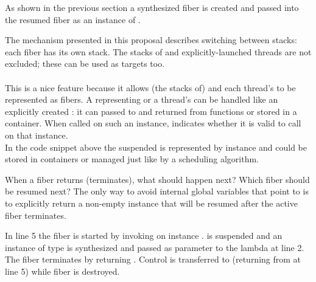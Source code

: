 
\label{representation}
As shown in the previous section a synthesized fiber is created and passed
into the resumed fiber as an instance of \fiber.\\

The mechanism presented in this proposal describes switching between stacks: each
fiber has its own stack. The stacks of \main and explicitly-launched threads
are not excluded; these can be used as targets too.\\
\\
This is a nice feature because it allows (the stacks of) \main and each
thread's \entryfn to be represented as fibers. A \fiber
representing \main or a thread's \entryfn can be handled like an
explicitly created \fiber: it can passed to and returned from functions or
stored in a container. When called on such an instance, \canxtresume indicates
whether it is valid to call \xtresumesome on that instance.\\

In the code snippet above the suspended \main is represented by instance
 and could be stored in containers or managed just like 
by a scheduling algorithm.\\


 When a fiber returns (terminates), what
should happen next? Which fiber should be resumed next? The only way to avoid
internal global variables that point to \main is to explicitly return a non-empty
\fiber instance that will be resumed after the active fiber terminates.

In line 5 the fiber is started by invoking \resume on instance . \main
is suspended and an instance of type  is synthesized and passed as
parameter  to the lambda at line 2. The fiber terminates by returning
. Control is transferred to \main (returning from  at
line 5) while fiber  is destroyed.\\

